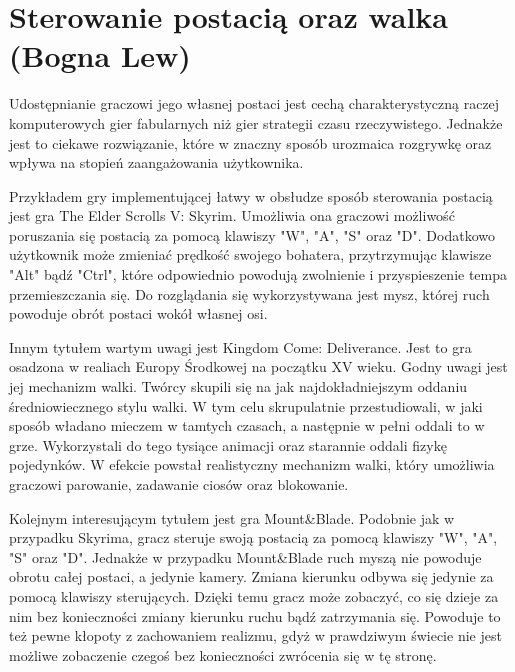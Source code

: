 \section{Sterowanie postacią oraz walka (Bogna Lew)}\label{s:walka}
Udostępnianie graczowi jego własnej postaci jest cechą charakterystyczną raczej komputerowych gier fabularnych niż gier
strategii czasu rzeczywistego. Jednakże jest to ciekawe rozwiązanie, które w znaczny sposób urozmaica rozgrywkę oraz
wpływa na stopień zaangażowania użytkownika.

Przykładem gry implementującej łatwy w obsłudze sposób sterowania postacią jest gra The Elder Scrolls V: Skyrim. Umożliwia
ona graczowi możliwość poruszania się postacią za pomocą klawiszy "W", "A", "S" oraz "D". Dodatkowo użytkownik może
zmieniać prędkość swojego bohatera, przytrzymując klawisze "Alt" bądź "Ctrl", które odpowiednio powodują zwolnienie i
przyspieszenie tempa przemieszczania się. Do rozglądania się wykorzystywana jest mysz, której ruch powoduje obrót postaci
wokół własnej osi.

Innym tytułem wartym uwagi jest Kingdom Come: Deliverance. Jest to gra osadzona w realiach Europy Środkowej na początku
XV wieku. Godny uwagi jest jej mechanizm walki. Twórcy skupili się na jak najdokładniejszym oddaniu średniowiecznego
stylu walki. W tym celu skrupulatnie przestudiowali, w jaki sposób władano mieczem w tamtych czasach, a następnie w
pełni oddali to w grze. Wykorzystali do tego tysiące animacji oraz starannie oddali fizykę pojedynków. W efekcie powstał
realistyczny mechanizm walki, który umożliwia graczowi parowanie, zadawanie ciosów oraz blokowanie.

Kolejnym interesującym tytułem jest gra Mount\&Blade. Podobnie jak w przypadku Skyrima, gracz steruje swoją postacią za
pomocą klawiszy  "W", "A", "S" oraz "D". Jednakże w przypadku Mount\&Blade ruch myszą nie powoduje obrotu całej postaci,
a jedynie kamery. Zmiana kierunku odbywa się jedynie za pomocą klawiszy sterujących. Dzięki temu gracz może zobaczyć, co
się dzieje za nim bez konieczności zmiany kierunku ruchu bądź zatrzymania się. Powoduje to też pewne kłopoty z zachowaniem
realizmu, gdyż w prawdziwym świecie nie jest możliwe zobaczenie czegoś bez konieczności zwrócenia się w tę stronę.

